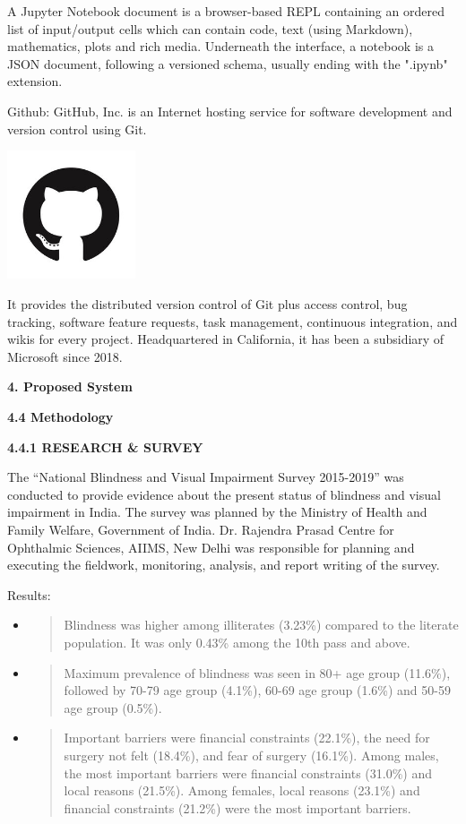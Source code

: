 \documentclass{article}
\begin{document}
A Jupyter Notebook document is a browser-based REPL containing an
ordered list of input/output cells which can contain code, text (using
Markdown), mathematics, plots and rich media. Underneath the interface,
a notebook is a JSON document, following a versioned schema, usually
ending with the ".ipynb" extension.

{Github}: GitHub, Inc. is an Internet hosting service for software
development and version control using Git.

\includegraphics[width=1.49306in,height=1.49306in]{media/12.jpg}

It provides the distributed version control of Git plus access control,
bug tracking, software feature requests, task management, continuous
integration, and wikis for every project. Headquartered in California,
it has been a subsidiary of Microsoft since 2018.

\textbf{4. Proposed System}

\textbf{4.4 Methodology}

\textbf{4.4.1 RESEARCH \& SURVEY}

The ``National Blindness and Visual Impairment Survey 2015-2019'' was
conducted to provide evidence about the present status of blindness and
visual impairment in India. The survey was planned by the Ministry of
Health and Family Welfare, Government of India. Dr. Rajendra Prasad
Centre for Ophthalmic Sciences, AIIMS, New Delhi was responsible for
planning and executing the fieldwork, monitoring, analysis, and report
writing of the survey.

{Results}:

\begin{itemize}
\item
  \begin{quote}
  Blindness was higher among illiterates (3.23\%) compared to the
  literate population. It was only 0.43\% among the 10th pass and above.
  \end{quote}
\item
  \begin{quote}
  Maximum prevalence of blindness was seen in 80+ age group (11.6\%),
  followed by 70-79 age group (4.1\%), 60-69 age group (1.6\%) and 50-59
  age group (0.5\%).
  \end{quote}
\item
  \begin{quote}
  Important barriers were financial constraints (22.1\%), the need for
  surgery not felt (18.4\%), and fear of surgery (16.1\%). Among males,
  the most important barriers were financial constraints (31.0\%) and
  local reasons (21.5\%). Among females, local reasons (23.1\%) and
  financial constraints (21.2\%) were the most important barriers.
  \end{quote}
\end{itemize}
\end{document}
